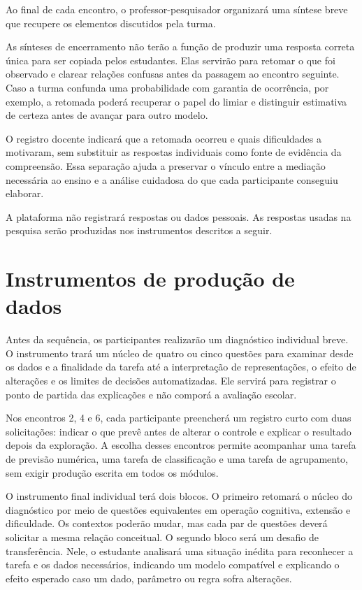 Ao final de cada encontro, o professor-pesquisador organizará uma síntese breve que recupere os elementos discutidos pela turma.

As sínteses de encerramento não terão a função de produzir uma resposta correta única para ser copiada pelos estudantes. Elas servirão para retomar o que foi observado e clarear relações confusas antes da passagem ao encontro seguinte. Caso a turma confunda uma probabilidade com garantia de ocorrência, por exemplo, a retomada poderá recuperar o papel do limiar e distinguir estimativa de certeza antes de avançar para outro modelo.

O registro docente indicará que a retomada ocorreu e quais dificuldades a motivaram, sem substituir as respostas individuais como fonte de evidência da compreensão. Essa separação ajuda a preservar o vínculo entre a mediação necessária ao ensino e a análise cuidadosa do que cada participante conseguiu elaborar.

A plataforma não registrará respostas ou dados pessoais. As respostas usadas na pesquisa serão produzidas nos instrumentos descritos a seguir.

\section{Instrumentos de produção de dados}

Antes da sequência, os participantes realizarão um diagnóstico individual breve. O instrumento trará um núcleo de quatro ou cinco questões para examinar desde os dados e a finalidade da tarefa até a interpretação de representações, o efeito de alterações e os limites de decisões automatizadas. Ele servirá para registrar o ponto de partida das explicações e não comporá a avaliação escolar.

Nos encontros 2, 4 e 6, cada participante preencherá um registro curto com duas solicitações: indicar o que prevê antes de alterar o controle e explicar o resultado depois da exploração. A escolha desses encontros permite acompanhar uma tarefa de previsão numérica, uma tarefa de classificação e uma tarefa de agrupamento, sem exigir produção escrita em todos os módulos.

O instrumento final individual terá dois blocos. O primeiro retomará o núcleo do diagnóstico por meio de questões equivalentes em operação cognitiva, extensão e dificuldade. Os contextos poderão mudar, mas cada par de questões deverá solicitar a mesma relação conceitual. O segundo bloco será um desafio de transferência. Nele, o estudante analisará uma situação inédita para reconhecer a tarefa e os dados necessários, indicando um modelo compatível e explicando o efeito esperado caso um dado, parâmetro ou regra sofra alterações.

